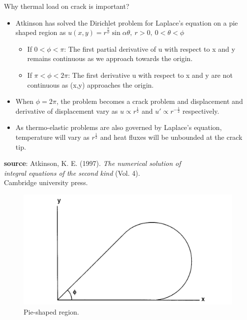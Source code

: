\documentclass{beamer}
\begin{document}
\begin{frame}[t,fragile]{Why thermal load on crack is important?}
    \vspace{-.3cm}
    \footnotesize
\begin{itemize}
    \item Atkinson has solved the Dirichlet problem for Laplace's equation on a pie shaped region as $u(x,y)= r^{\frac{\pi}{\phi}}\sin\alpha\theta,\  r>0,\ 0<\theta<\phi$
        \begin{itemize}
                \footnotesize
    \item If $0<\phi<\pi$:
        The first partial derivative of u with respect to x and y remains continuous as we approach towards the origin. 
    \item If $\pi<\phi<2\pi$:
        The first derivative u with respect to x and y are not continuous as (x,y) approaches the origin. 
    \end{itemize}
    \item When $\phi=2\pi$, the problem becomes a crack problem and displacement and derivative of displacement vary as $u \propto r^{\frac{1}{2}}$ and $u'\propto  r^{-\frac{1}{2}}$ respectively. 
    \item As thermo-elastic problems are also governed by Laplace's equation, temperature will vary as $r^{\frac{1}{2}}$ and heat fluxes will be unbounded at the crack tip. 
\end{itemize}
  \tiny
  \vspace{10pt}
  \hspace{10pt}
   \textbf{source}: Atkinson, K. E. (1997).
    \emph{The numerical solution of \\
  \hspace{10pt}
    integral equations of the second kind} (Vol. 4). \\
  \hspace{10pt}
    Cambridge university press.
\begin{figure}
    \centering
    \vspace{-50pt}
    \includegraphics[width=.3\textwidth]{pie.png}
    \caption{\footnotesize Pie-shaped region.}
    \label{pie}
\end{figure}
 
\end{frame}
\end{document}
